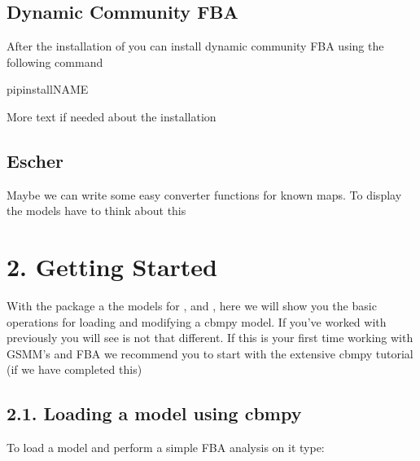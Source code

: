 \documentclass[letterpaper,10pt,english]{sphinxmanual}
\begin{document}
\section{Dynamic Community FBA}
\label{\detokenize{1_installation/home:dynamic-community-fba}}
\sphinxAtStartPar
After the installation of  you can install dynamic community FBA using the following command

\begin{sphinxVerbatim}[commandchars=\\\{\}]
pipinstallNAME
\end{sphinxVerbatim}

\sphinxAtStartPar
More text if needed about the installation


\section{Escher}
\label{\detokenize{1_installation/home:escher}}
\sphinxAtStartPar
Maybe we can write some easy converter functions for known maps. To display the models
have to think about this

\sphinxstepscope


\chapter{2. Getting Started}
\label{\detokenize{2_getting_started/home:getting-started}}\label{\detokenize{2_getting_started/home::doc}}
\sphinxAtStartPar
With the package a the models for ,  and , here
we will show you the basic operations for loading and modifying a cbmpy model. If you’ve worked with  previously
you will see  is not that different. If this is your first time working with GSMM’s and FBA we recommend  you to start with
the extensive cbmpy tutorial (if we have completed this)


\section{2.1. Loading a model using cbmpy}
\label{\detokenize{2_getting_started/home:loading-a-model-using-cbmpy}}
\sphinxAtStartPar
To load a model and perform a simple FBA analysis on it type:
\end{document}
